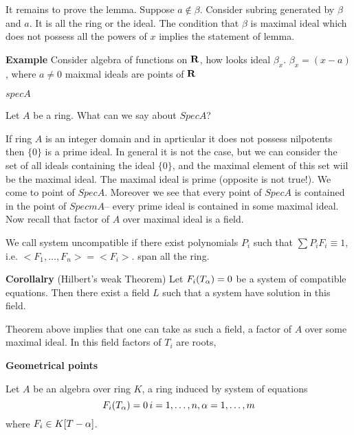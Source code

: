 It remains to prove the lemma. 
Suppose $a\not\in \beta$. Consider subring generated by $\beta$ and $a$.
It is all the ring or the ideal. The condition that $\beta$ is maximal 
ideal which does not possess all the powers of $x$ implies the 
statement of lemma.

\bigskip


{\bf Example} Consider algebra of functions on ${\bf R}$, 
how looks ideal $\beta_x$. $\beta_x=(x-a)$, where $a\not=0$
 maixmal ideals are points of ${\bf R}$

\bigskip

\centerline {$spec A$}

Let $A$ be a ring. What can we say about $Spec A$?

If ring $A$ is an integer domain and
in aprticular it does not possess nilpotents then $\{0\}$ is  
a prime ideal. In general it is not the case, but we can consider
the set of all ideals containing the ideal $\{0\}$, and the maximal element
of this set wiil be the maximal ideal. The maximal ideal is prime
 (opposite is not true!). We come to point of $Spec A$. Moreover we
see that every point of $Spec A$ is contained in the point of $Specm A$--
every prime ideal is contained in some maximal ideal. Now recall that
factor of $A$ over maximal ideal is a field. 


  We call system uncompatible if
  there exist polynomials $P_i$ such that $\sum P_iF_i\equiv 1$, i.e.
$<F_1,\dots, F_n>=<F_i>$.
span all the ring.


  {\bf Corollalry} (Hilbert's weak Theorem)
Let $F_i(T_\alpha)=0$ be a system of compatible equations.
Then there exist a field $L$ such that a system have solution in this field.

  Theorem above implies that one can take as such a field, a factor of
  $A$ over some maximal ideal. In this field factors of $T_i$ are roots, 

\bigskip


  {\bf Geometrical points}

Let $A$ be an algebra over ring $K$, a ring 
induced by system of equations
           $$
            F_i(T_\alpha)=0\, i=1,\dots,n, \alpha=1,\dots,m
           $$
where $F_i\in K[T-\alpha]$.
 


